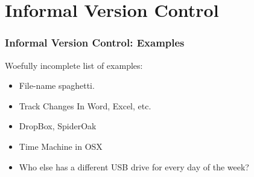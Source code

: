 \documentclass{beamer}
\begin{document}
\section{Informal Version Control} %

\begin{frame} %
  \frametitle{Informal Version Control: Examples}
  {\large Woefully incomplete list of examples:}
  \bigskip
  \begin{itemize}
  \item File-name spaghetti.
  \item Track Changes In Word, Excel, etc.
  \item DropBox, SpiderOak
  \item Time Machine in OSX
  \item Who else has a different USB drive for every day of the week?
  \end{itemize} 
\end{frame}
\end{document}
